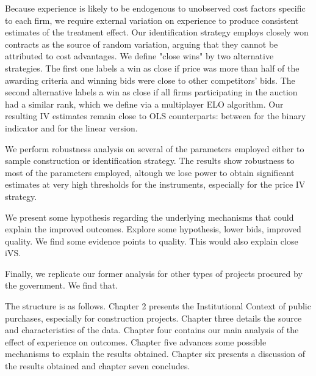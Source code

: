  Because experience is likely to be endogenous to unobserved cost factors specific to each firm, we require external variation on experience to produce consistent estimates of the treatment effect. Our identification strategy employs closely won contracts as the source of random variation, arguing that they cannot be attributed to cost advantages. We define "close wins" by two alternative strategies. The first one labels a win as close if price was more than half of the awarding criteria and winning bids were close to other competitors' bids. The second alternative labels a win as close if all firms participating in the auction had a similar rank, which we define via a multiplayer ELO algorithm. Our resulting IV estimates remain close to OLS counterparts: between for the binary indicator and for the linear version.

 We perform robustness analysis on several of the parameters employed either to sample construction or identification strategy. The results show robustness to most of the parameters employed, altough we lose power to obtain significant estimates at very high thresholds for the instruments, especially for the price IV strategy.

We present some hypothesis regarding the underlying mechanisms that could explain the improved outcomes. Explore some hypothesis, lower bids, improved quality. We find some evidence points to quality. This would also explain close iVS.

Finally, we replicate our former analysis for other types of projects procured by the government. We find that.

The structure is as follows. Chapter 2 presents the Institutional Context of public purchases, especially for construction projects. Chapter three details the source and characteristics of the data. Chapter four contains our main analysis of the effect of experience on outcomes. Chapter five advances some possible mechanisms to explain the results obtained. Chapter six presents a discussion of the results obtained and chapter seven concludes.
